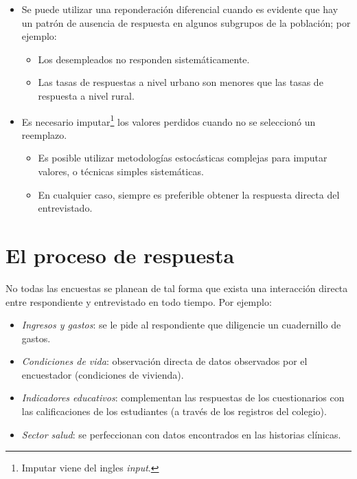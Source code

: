 \documentclass[
  10pt,
  spanish,
]{book}
\providecommand{\tightlist}{%
  \setlength{\itemsep}{0pt}\setlength{\parskip}{0pt}}
\begin{document}
\begin{itemize}
\tightlist
\item
  Se puede utilizar una reponderación diferencial cuando es evidente que hay un patrón de ausencia de respuesta en algunos subgrupos de la población; por ejemplo:

  \begin{itemize}
  \tightlist
  \item
    Los desempleados no responden sistemáticamente.
  \item
    Las tasas de respuestas a nivel urbano son menores que las tasas de respuesta a nivel rural.
  \end{itemize}
\item
  Es necesario imputar\footnote{Imputar viene del ingles \emph{input}.} los valores perdidos cuando no se seleccionó un reemplazo.

  \begin{itemize}
  \tightlist
  \item
    Es posible utilizar metodologías estocásticas complejas para imputar valores, o técnicas simples sistemáticas.
  \item
    En cualquier caso, siempre es preferible obtener la respuesta directa del entrevistado.
  \end{itemize}
\end{itemize}

\hypertarget{el-proceso-de-respuesta}{%
\section{El proceso de respuesta}\label{el-proceso-de-respuesta}}

No todas las encuestas se planean de tal forma que exista una interacción directa entre respondiente y entrevistado en todo tiempo. Por ejemplo:

\begin{itemize}
\tightlist
\item
  \emph{Ingresos y gastos}: se le pide al respondiente que diligencie un cuadernillo de gastos.
\item
  \emph{Condiciones de vida}: observación directa de datos observados por el encuestador (condiciones de vivienda).
\item
  \emph{Indicadores educativos}: complementan las respuestas de los cuestionarios con las calificaciones de los estudiantes (a través de los registros del colegio).
\item
  \emph{Sector salud}: se perfeccionan con datos encontrados en las historias clínicas.
\end{itemize}
\end{document}
